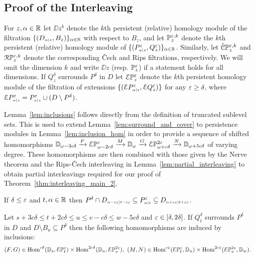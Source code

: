 
\subsection{Proof of the Interleaving}

For $z,\alpha\in\R$ let $\DD{z}^k$ denote the $k$th persistent (relative) homology module of the filtration $\{(D\subi{z}{\alpha},B_z)\}_{\alpha\in\R}$ with respect to $B_z$, and let $\PP{z}{\e,k}$ denote the $k$th persistent (relative) homology module of $\{(P\subi{z}{\alpha}^\e,Q_z^\e)\}_{\alpha\in\R}$.
Similarly, let $\CPP{z}{\e,k}$ and $\RPP{z}{\e,k}$ denote the corresponding \v Cech and Rips filtrations, respectively.
We will omit the dimension $k$ and write $\DD{z}$ (resp. $\PP{z}{\e}$) if a statement holds for all dimensions.
If $Q_z^\delta$ surrounds $P^\delta$ in $D$ let $\ext{\PP{z}{\e}}$ denote the $k$th persistent homology module of the filtration of extensions $\{(\ext{P\subi{z}{\alpha}^\e},\ext{Q_z^\e})\}$ for any $\e\geq\delta$, where $\ext{P\subi{z}{\alpha}^\e} = P\subi{z}{\alpha}^\e \cup (D\setminus P^\delta)$.

Lemma~\ref{lem:inclusions} follows directly from the definition of truncated sublevel sets.
This is used to extend Lemma~\ref{lem:surround_and_cover} to persistence modules in Lemma~\ref{lem:inclusion_hom} in order to provide a sequence of shifted homomorphisms $\DD{\omega-3c\delta}\xrightarrow{F}\E\PP{\omega-2c\delta}{\e}\xrightarrow{M}\DD{\omega}\xrightarrow{G}\E\PP{\omega+c\delta}{2\e}\xrightarrow{N}\DD{\omega+5c\delta}$ of varying degree.
These homomorphisms are then combined with those given by the Nerve theorem and the Rips-\v Cech interleaving in Lemma~\ref{lem:partial_interleaving} to obtain partial interleavings required for our proof of Theorem~\ref{thm:interleaving_main_2}.

\begin{lemma}\label{lem:inclusions}
  If $\delta\leq\e$ and $t,\alpha\in\R$ then $P^\delta\cap D\subi{t-c\e}{\alpha-c\e}\subseteq P\subi{t}{\alpha}^\e\subseteq D\subi{t+c\e}{\alpha+c\e}$.
\end{lemma}

\begin{lemma}\label{lem:inclusion_hom}
  Let $s + 3c\delta\leq t + 2c\delta\leq u\leq v-c\delta\leq w-5c\delta$ and $\e\in [\delta,2\delta]$.
  If $Q_{t}^\delta$ surrounds $P^\delta$ in $D$ and $D\setminus B_u\subseteq P^\delta$ then the following homomorphisms are induced by inclusions:
  \[(F, G)\in \Hom^{c\delta}(\DD{s}, \E\PP{t}{\e})\times \Hom^{2c\delta}(\DD{u}, \E\PP{v}{2\e}),\ (M, N)\in \Hom^{c\e}(\E\PP{t}{\e},\DD{u})\times\Hom^{2c\e}(\E\PP{v}{2\e}, \DD{w}).\]
\end{lemma}

